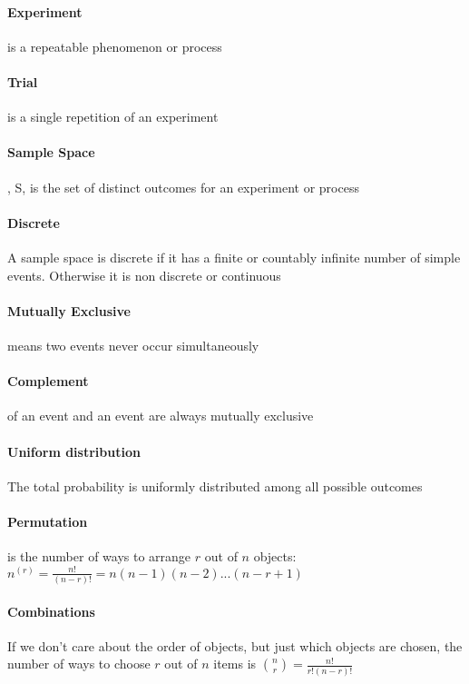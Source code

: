 \documentclass[12pt]{report}
\begin{document}
    \paragraph{Experiment} is a repeatable phenomenon or process
    \paragraph{Trial} is a single repetition of an experiment
    \paragraph{Sample Space}, S, is the set of distinct outcomes for an
    experiment or process
    \paragraph{Discrete} A sample space is discrete if it has a finite or
    countably infinite number of simple events. Otherwise it is non discrete or
    continuous

    \paragraph{Mutually Exclusive} means two events never occur simultaneously

    \paragraph{Complement} of an event and an event are always mutually
    exclusive

    \paragraph{Uniform distribution} The total probability is uniformly
    distributed among all possible outcomes

    \paragraph{Permutation} is the number of ways to arrange $r$ out of $n$
    objects: $ n ^ {(r)} = \frac{n!}{(n-r)!} = n(n-1)(n-2) ... (n-r+1)$

    \paragraph{Combinations} If we don't care about the order of objects, but
    just which objects are chosen, the number of ways to choose $r$ out of $n$
    items is $\binom{n}{r} = \frac{n!}{r!(n-r)!}$
\end{document}
